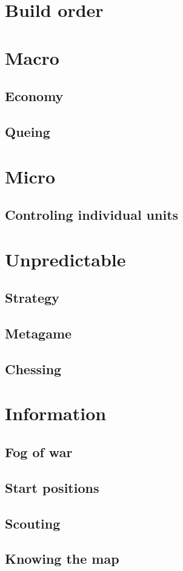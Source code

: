 \section{Build order}

\section{Macro}
\subsection{Economy}
\subsection{Queing}

\section{Micro}
\subsection{Controling individual units}

\section{Unpredictable}
\subsection{Strategy}
\subsection{Metagame}
\subsection{Chessing}

\section{Information}
\subsection{Fog of war}
\subsection{Start positions}
\subsection{Scouting}
\subsection{Knowing the map}



